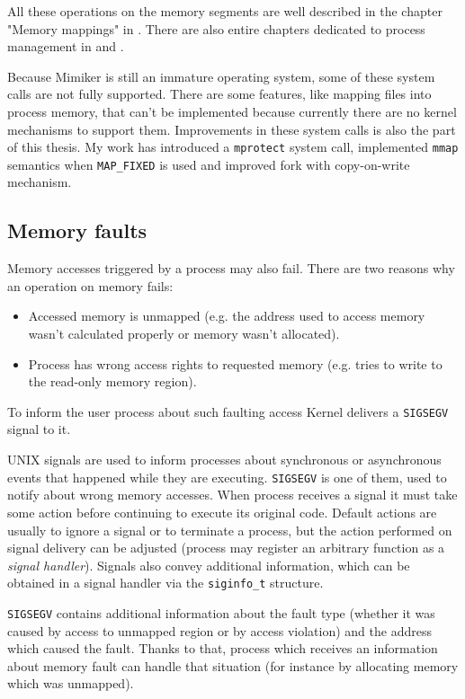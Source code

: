 All these operations on the memory segments are well described in the chapter "Memory mappings" in \cite{kerrisk}.
There are also entire chapters dedicated to process management in \cite{kerrisk} and \cite{apue}.

Because Mimiker is still an immature operating system, some of these system calls are not fully supported.
There are some features, like mapping files into process memory, that can't be implemented because currently there are no kernel mechanisms to support them.
Improvements in these system calls is also the part of this thesis.
My work has introduced a \texttt{mprotect} system call,
implemented \texttt{mmap} semantics when \texttt{MAP_FIXED} is used and improved fork with copy-on-write mechanism.

\subsection{Memory faults}

Memory accesses triggered by a process may also fail.
There are two reasons why an operation on memory fails:
\begin{itemize}
  \item Accessed memory is unmapped (e.g. the address used to access memory wasn't calculated properly or memory wasn't allocated).
  \item Process has wrong access rights to requested memory (e.g. tries to write to the read-only memory region).
\end{itemize}
To inform the user process about such faulting access Kernel delivers a {\tt SIGSEGV} signal to it.

UNIX signals are used to inform processes about synchronous or asynchronous events that happened while they are executing.
{\tt SIGSEGV} is one of them, used to notify about wrong memory accesses.
When process receives a signal it must take some action before continuing to execute its original code.
Default actions are usually to ignore a signal or to terminate a process, but the action performed on signal delivery can be
adjusted (process may register an arbitrary function as a {\it signal handler}).
Signals also convey additional information, which can be obtained in a signal handler via the \texttt{siginfo_t} structure.

{\tt SIGSEGV} contains additional information about the fault type (whether it was caused by access to unmapped region or by access violation) and
the address which caused the fault.
Thanks to that, process which receives an information about memory fault can handle that situation (for instance by allocating memory which was unmapped).

